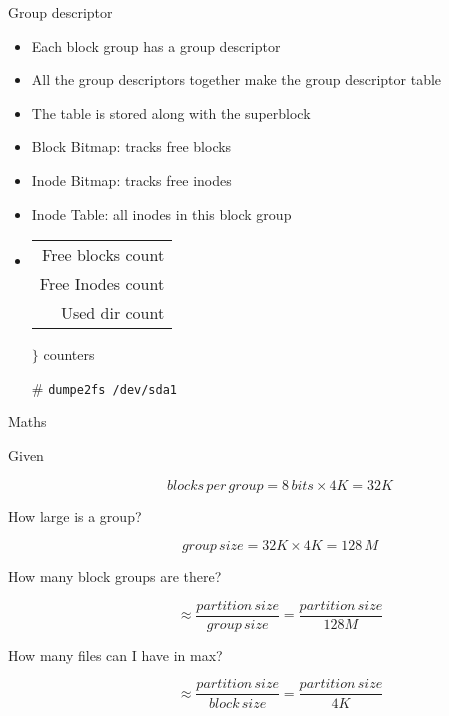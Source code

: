 \begin{frame}
  \begin{block}{Group descriptor}
    \begin{itemize}
    \item Each block group has a group descriptor
    \item All the group descriptors together make the \alert{group descriptor table}
    \item The table is stored along with the superblock
    \item \alert{Block Bitmap:} tracks free blocks
    \item \alert{Inode Bitmap:} tracks free inodes
    \item \alert{Inode Table:} all inodes in this block group
    \item
      \begin{tabular}{r}
        \alert{Free blocks count}\\
        \alert{Free Inodes count}\\
        \alert{Used dir count}
      \end{tabular}$\biggr\}$ counters
    \end{itemize}
    \begin{itemize}
    \item[\#] \texttt{dumpe2fs /dev/sda1}
    \end{itemize}    
  \end{block}
\end{frame}

\begin{frame}{Maths}
  \begin{description}
  \item[Given
    \begin{small}
      \begin{tabular}{l}
        $block\,size = 4K$\\
        $block\,bitmap = 1\,blk$   
      \end{tabular}
    \end{small}, then]
    $$blocks\,per\,group = 8\,bits\times{}4K = 32K$$ 
  \item[How large is a group?]
  $$group\,size = 32K\times{}4K = 128\,M$$
  \item[How many block groups are there?]
  $$\approx{}\frac{partition\,size}{group\,size} = \frac{partition\,size}{128M}$$
  \item[How many files can I have in max?]
  $$\approx{}\frac{partition\,size}{block\,size} = \frac{partition\,size}{4K}$$
\end{description}
\end{frame}

